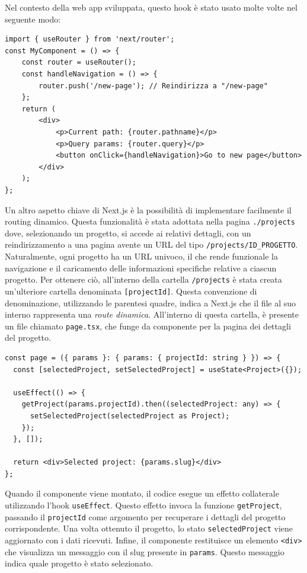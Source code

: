 \documentclass[target=bach,aauheader=,style=]{thud}
\begin{document}
\noindent Nel contesto della web app sviluppata, questo hook è stato usato molte volte nel seguente modo:

\begin{lstlisting}[caption=\texttt{useRouter} per la navigazione tra URL]
import { useRouter } from 'next/router';
const MyComponent = () => {
    const router = useRouter();
    const handleNavigation = () => {
        router.push('/new-page'); // Reindirizza a "/new-page"
    };
    return (
        <div>
            <p>Current path: {router.pathname}</p>
            <p>Query params: {router.query}</p>
            <button onClick={handleNavigation}>Go to new page</button>
        </div>
    );
};
\end{lstlisting}

\noindent Un altro aspetto chiave di Next.js è la possibilità di implementare facilmente il routing dinamico. Questa funzionalità è stata adottata nella pagina \texttt{./projects} dove, selezionando un progetto, si accede ai relativi dettagli, con un reindirizzamento a una pagina avente un URL del tipo \texttt{/projects/ID\_PROGETTO}. Naturalmente, ogni progetto ha un URL univoco, il che rende funzionale la navigazione e il caricamento delle informazioni specifiche relative a ciascun progetto. Per ottenere ciò, all'interno della cartella \texttt{/projects} è stata creata un'ulteriore cartella denominata \texttt{[projectId]}. Questa convenzione di denominazione, utilizzando le parentesi quadre, indica a Next.js che il file al suo interno rappresenta una \textit{route dinamica}. All'interno di questa cartella, è presente un file chiamato \texttt{page.tsx}, che funge da componente per la pagina dei dettagli del progetto.

\begin{lstlisting}[caption=Routing dinamico con Next.js]
const page = ({ params }: { params: { projectId: string } }) => {
  const [selectedProject, setSelectedProject] = useState<Project>({});
  
  useEffect(() => {
    getProject(params.projectId).then((selectedProject: any) => {
      setSelectedProject(selectedProject as Project);
    });
  }, []);

  return <div>Selected project: {params.slug}</div>
};
\end{lstlisting}

\noindent Quando il componente viene montato, il codice esegue un effetto collaterale utilizzando l'hook \texttt{useEffect}. Questo effetto invoca la funzione \texttt{getProject}, passando il \texttt{projectId} come argomento per recuperare i dettagli del progetto corrispondente. Una volta ottenuto il progetto, lo stato \texttt{selectedProject} viene aggiornato con i dati ricevuti. Infine, il componente restituisce un elemento \texttt{<div>} che visualizza un messaggio con il slug presente in \texttt{params}. Questo messaggio indica quale progetto è stato selezionato. 
\end{document}
